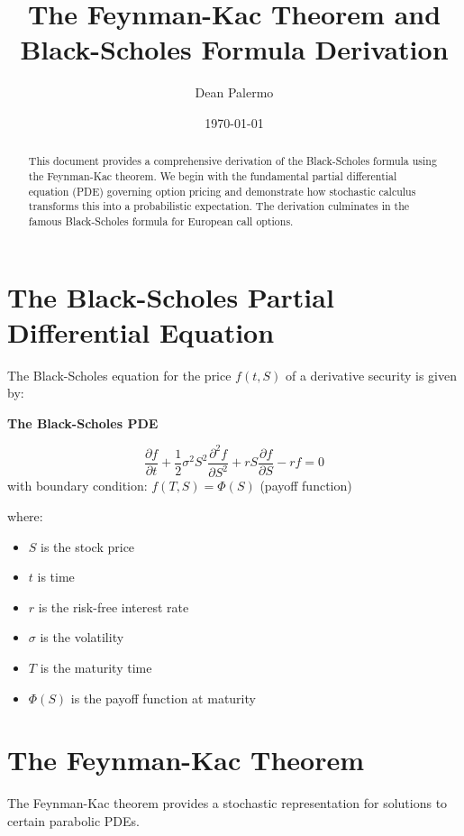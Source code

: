 \documentclass[11pt,a4paper]{article}
\title{\textbf{\Large The Feynman-Kac Theorem and\\Black-Scholes Formula Derivation}}
\author{Dean Palermo}
\date{\today}
\newenvironment{keybox}[1][Key Result]
{\begin{leftbar}\noindent\textbf{\color{theoremblue}#1}\par\vspace{0.5em}}
{\end{leftbar}}
\begin{document}
\maketitle

\begin{abstract}
This document provides a comprehensive derivation of the Black-Scholes formula using the Feynman-Kac theorem. We begin with the fundamental partial differential equation (PDE) governing option pricing and demonstrate how stochastic calculus transforms this into a probabilistic expectation. The derivation culminates in the famous Black-Scholes formula for European call options.
\end{abstract}

\tableofcontents
\newpage

\section{The Black-Scholes Partial Differential Equation}

The Black-Scholes equation for the price $f(t,S)$ of a derivative security is given by:

\begin{keybox}[The Black-Scholes PDE]
\begin{equation}
\frac{\partial f}{\partial t} + \frac{1}{2}\sigma^2 S^2 \frac{\partial^2 f}{\partial S^2} + rS \frac{\partial f}{\partial S} - rf = 0
\end{equation}
with boundary condition: $f(T,S) = \Phi(S)$ (payoff function)
\end{keybox}

where:
\begin{itemize}
    \item $S$ is the stock price
    \item $t$ is time
    \item $r$ is the risk-free interest rate
    \item $\sigma$ is the volatility
    \item $T$ is the maturity time
    \item $\Phi(S)$ is the payoff function at maturity
\end{itemize}

\section{The Feynman-Kac Theorem}

The Feynman-Kac theorem provides a stochastic representation for solutions to certain parabolic PDEs.
\end{document}
